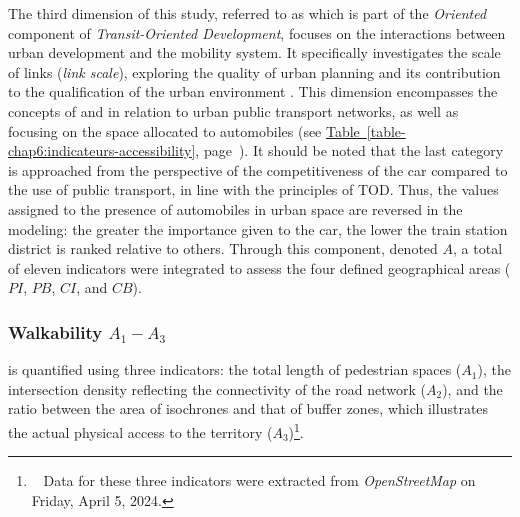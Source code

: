 \begin{refsegment}
The third dimension of this study, referred to as  which is part of the \textsl{Oriented} component of \textsl{Transit-Oriented Development}, focuses on the interactions between urban development and the mobility system. It specifically investigates the scale of links (\textsl{link scale}), exploring the quality of urban planning and its contribution to the qualification of the urban environment \textcolor{blue}{\autocite[294]{zhang_built_2023}}. This dimension encompasses the concepts of   and  in relation to urban public transport networks, as well as  focusing on the space allocated to automobiles (see \hyperref[table-chap6:indicateurs-accessibility]{Table~\ref{table-chap6:indicateurs-accessibility}}, page~\pageref{table-chap6:indicateurs-accessibility}). It should be noted that the last category is approached from the perspective of the competitiveness of the car compared to the use of public transport, in line with the principles of \acrshort{TOD}. Thus, the values assigned to the presence of automobiles in urban space are reversed in the modeling: the greater the importance given to the car, the lower the train station district is ranked relative to others. Through this component, denoted \(A\), a total of eleven indicators were integrated to assess the four defined geographical areas (\(PI\), \(PB\), \(CI\), and \(CB\)).


\subsubsection*{Walkability \(A_{1} - A_{3}\)
    \label{chap6:indicateurs-accessibility-marchabilite}
    }

 is quantified using three indicators: the total length of pedestrian spaces (\(A_{1}\)), the intersection density reflecting the connectivity of the road network (\(A_{2}\)), and the ratio between the area of isochrones and that of buffer zones, which illustrates the actual physical access to the territory (\(A_{3}\))\footnote{~
    Data for these three indicators were extracted from \textsl{OpenStreetMap} on Friday, April 5, 2024.
}.


\end{refsegment}
